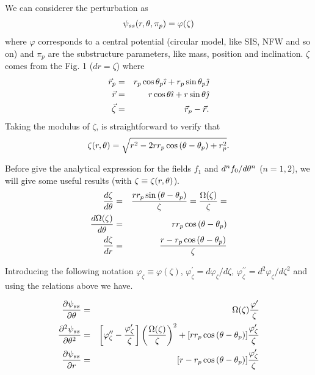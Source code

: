 We can considerer the perturbation as
\begin{equation}
\psi_{ss}(r,\theta,\pi_p)=\varphi(\zeta)
\end{equation}
where $\varphi$ corresponds to a central potential (circular model, like SIS, NFW and so on) and $\pi_p$
are the substructure parameters, like mass, position and inclination. $\zeta$ comes from the Fig. 1 ($dr=\zeta$)
where
\begin{eqnarray}
\vec{r}_p&=&r_p\cos{\theta_p}\hat{\imath} + r_p\sin{\theta_p}\hat{\jmath}\\
\vec{r}&=&r\cos{\theta}\hat{\imath} + r\sin{\theta}\hat{\jmath}\\
\vec{\zeta}&=&\vec{r}_p-\vec{r}.
\end{eqnarray}
Taking the modulus of $\zeta$, is straightforward to verify that
\begin{equation}
\zeta(r,\theta)=\sqrt{r^2-2r r_p\cos{(\theta-\theta_p)}+r^2_p}.
\label{xirte}
\end{equation}

Before give the analytical expression for the fields $f_1$ and $d^nf_0/d\theta^n$ ($n=1,2$), we will
give some useful results (with $\zeta\equiv\zeta(r,\theta)$).
\begin{eqnarray}
\dfrac{d\zeta}{d\theta}&=&\dfrac{r r_p \sin{(\theta-\theta_p)}}{\zeta}=\dfrac{\Omega(\zeta)}{\zeta}=\\
\dfrac{d\Omega(\zeta)}{d\theta}&=&r r_p\cos{(\theta-\theta_p)}\\
\dfrac{d\zeta}{dr}&=&\dfrac{r-r_p\cos{(\theta-\theta_p)}}{\zeta}
\end{eqnarray}

Introducing the following notation $\varphi_\zeta\equiv \varphi(\zeta) $, $\varphi^\prime_\zeta=d\varphi_\zeta/d\zeta$, $\varphi^{\prime\prime}_\zeta=d^2\varphi_\zeta/d\zeta^2$
and using the relations above we have.

\begin{eqnarray}
\dfrac{\prtl \psi_{ss}}{\prtl \te}&=&\Omega(\zeta)\dfrac{\varphi^\prime}{\zeta}\label{df0}\\
\dfrac{\prtl^2 \psi_{ss}}{\prtl\te^2}&=&\left[\varphi^{\prime\prime}_\zeta-\dfrac{\varphi^\prime_\zeta}{\zeta}\right]%
\left(\dfrac{\Omega(\zeta)}{\zeta}\right)^2+[r r_p\cos{(\te-\tep)}]\dfrac{\varphi^\prime_\zeta}{\zeta}\label{ddf0}\\
\dfrac{\prtl \psi_{ss}}{\prtl r}&=&[r-r_p\cos{(\te-\tep)}]\dfrac{\varphi^\prime_\zeta}{\zeta}\label{f1}
\end{eqnarray}

